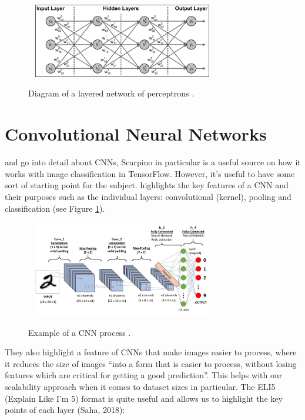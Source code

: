 \documentclass[12pt,a4paper]{report}
\begin{document}
\begin{figure}[h]\
    \centering
    \includegraphics[width=0.7\textwidth]{network.png}
    \caption{Diagram of a layered network of perceptrons \citep{ScarpinoMatthew2018Tfd}.}
\end{figure}
\break

\section{Convolutional Neural Networks}
\label{subsec:cnn}

\citet{goodfellow2016deep} and \citet{ScarpinoMatthew2018Tfd} go into detail about CNNs, Scarpino in particular is a
useful source on how it works with image classification in TensorFlow. However, it's useful to have 
some sort of starting point for the subject. \citet{saha2018} highlights the key features of a CNN and their
purposes such as the individual layers: convolutional (kernel),  pooling and classification (see Figure \ref{fig:cnnSimple}).

\begin{figure}[h]\
    \centering
    \includegraphics[width=0.7\textwidth]{saha.jpg}
    \caption{Example of a CNN process \citep{saha2018}.}
    \label{fig:cnnSimple}
\end{figure}

They also highlight a feature of CNNs that make images easier to process, where it reduces the size of images “into a 
form that is easier to process, without losing features which are critical for getting a good prediction”. This helps 
with our scalability approach when it comes to dataset sizes in particular. The ELI5 (Explain Like I'm 5) format is 
quite useful and allows us to highlight the key points of each layer (Saha, 2018):
\end{document}

